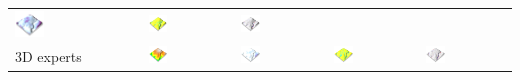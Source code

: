 \documentclass[prodmode,acmtochi]{acmsmall} %
\begin{document}
\begin{table}
{\begin{tabular}{m{} m{} m{} m{} m{}}
\includegraphics[width=0.24\textwidth]{images/render_3d/3d_novices/stdev_regression_difference_series_5.png} &
\includegraphics[width=0.24\textwidth]{images/render_3d/3d_novices/mean_depth_5.png} &
\includegraphics[width=0.24\textwidth]{images/render_3d/3d_novices/mean_depth_difference_5.png}\\
%
3D experts & 
\includegraphics[width=0.24\textwidth]{images/render_3d/3d_experts/mean_dem_5.png} &
\includegraphics[width=0.24\textwidth]{images/render_3d/3d_experts/stdev_regression_difference_series_5.png} &
\includegraphics[width=0.24\textwidth]{images/render_3d/3d_experts/mean_depth_5.png} &
\includegraphics[width=0.24\textwidth]{images/render_3d/3d_experts/mean_depth_difference_5.png}\\

\end{tabular}}
\end{table}
\end{document}
